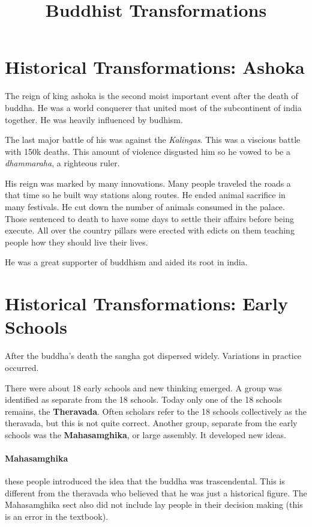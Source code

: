 \documentclass{article}
\begin{document}
\title{Buddhist Transformations}
\maketitle
\section*{Historical Transformations: Ashoka}
\label{sec:ashoka}
The reign of king ashoka is the second moist important event after the death of buddha. He was a world conquerer that united most of the subcontinent of india together. He was heavily influenced by budhism.

The last major battle of his was against the \emph{Kalingas}. This was a viscious battle with 150k deaths. This amount of violence disgusted him so he vowed to be a \emph{dhammaraha}, a righteous ruler.

His reign was marked by many innovations. Many people traveled the roads a that time so he built way stations along routes. He ended animal sacrifice in many festivals. He cut down the number of animals consumed in the palace. Those sentenced to death to have some days to settle their affairs before being execute. All over the country pillars were erected with edicts on them teaching people how they should live their lives.

He was a great supporter of buddhism and aided its root in india.

\section*{Historical Transformations: Early Schools}
\label{sec:early_schools}
After the buddha's death the sangha got dispersed widely. Variations in practice occurred.

There were about 18 early schools and new thinking emerged. A group was identified as separate from the 18 schools. Today only one of the 18 schools remains, the \textbf{Theravada}. Often scholars refer to the 18 schools collectively as the theravada, but this is not quite correct. Another group, separate from the early schools was the \textbf{Mahasamghika}, or large assembly. It developed new ideas.

\paragraph{Mahasamghika}
\label{par:mahasamghika}
these people introduced the idea that the buddha was trascendental. This is different from the theravada who believed that he was just a historical figure. The Mahasamghika sect also did not include lay people in their decision making (this is an error in the textbook).
\end{document}
